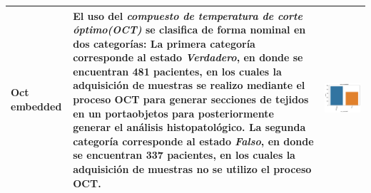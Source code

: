 \begin{table}[!htb]
\begin{threeparttable}
\begin{tabular}{p{2.5cm} p{7cm} p{6.5cm}}
			Oct embedded
			& El uso del \textit{compuesto de temperatura de corte óptimo(OCT)} se clasifica de forma nominal en dos categorías: La primera categoría corresponde al estado \textit{Verdadero}, en donde se encuentran 481 pacientes, en los cuales la adquisición de muestras se realizo mediante el proceso OCT para generar secciones de tejidos en un portaobjetos para posteriormente generar el análisis histopatológico. La segunda categoría corresponde al estado \textit{Falso}, en donde se encuentran 337 pacientes, en los cuales la adquisición de muestras no se utilizo el proceso OCT.
			& \begin{center}\includegraphics[width=1\linewidth]{NOTEBOOK/IMAGENES_DESCRIPTIVAS/37_oct_embedded}\end{center}
			\\ \hline
		\end{tabular}
	\end{threeparttable}
\end{table}

